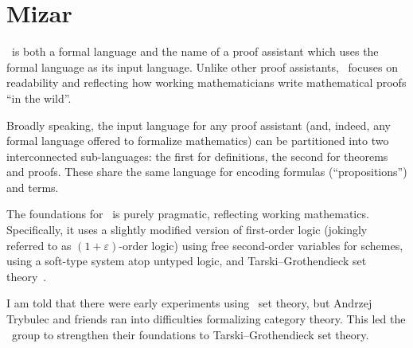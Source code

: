 \chapter{Mizar}

\begin{node}\label{mizar-0000}%
\Mizar\ is both a formal language and the name of a proof assistant
which uses the formal language as its input language. Unlike other proof
assistants, \Mizar\ focuses on readability and reflecting how working
mathematicians write mathematical proofs ``in the wild''.

Broadly speaking, the input language for any proof assistant (and,
indeed, any formal language offered to formalize mathematics) can be
partitioned into two interconnected sub-languages: the first for definitions,
the second for theorems and proofs. These share the same language for
encoding formulas (``propositions'') and terms.
\end{node}

\begin{node}[Foundations]\label{mizar-0001}%
The foundations for \Mizar\ is purely pragmatic, reflecting working
mathematics. Specifically, it uses a slightly modified version of
first-order logic (jokingly referred to as $(1+\varepsilon)$-order logic)
using free second-order variables for schemes, using a soft-type system
atop untyped logic, and Tarski--Grothendieck set theory~.

I am told that there were early experiments using \MK\ set theory, but
Andrzej Trybulec and friends ran into difficulties formalizing category
theory. This led the \Mizar\ group to strengthen their foundations to
Tarski--Grothendieck set theory.
\end{node}

